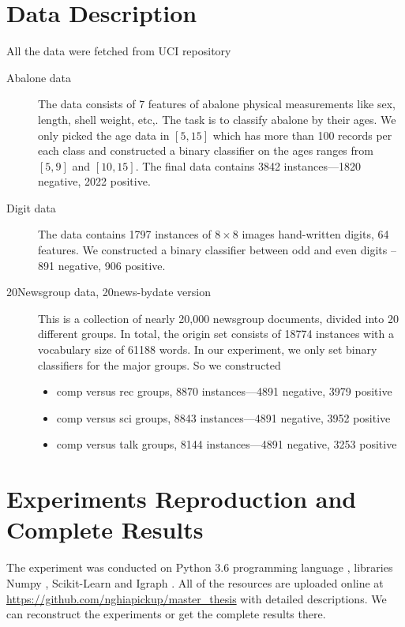 \section*{Data Description}
All the data were fetched from UCI repository \parencite{Dua:2017}
\begin{description}
	\item[Abalone data] The data consists of 7 features of abalone physical measurements like sex, length, shell weight, etc,. The task is to classify abalone by their ages. We only picked the age data in $[5, 15]$ which has more than 100 records per each class and constructed a binary classifier on the ages ranges from $[5,9]$ and $[10, 15]$. The final data contains 3842 instances---1820 negative, 2022 positive.
	
	\item[Digit data] The data contains 1797 instances of $8 \times 8$ images hand-written digits, 64 features. We constructed a binary classifier between odd and even digits -- 891 negative, 906 positive.
		
	\item[20Newsgroup data, 20news-bydate version] This is a collection of nearly 20,000 newsgroup documents, divided into 20 different groups. In total, the origin set consists of 18774 instances with a vocabulary size of 61188 words. In our experiment, we only set binary classifiers for the major groups. So we constructed 
	\begin{itemize}
		\item comp versus rec groups, 8870 instances---4891 negative, 3979 positive
		\item comp versus sci groups, 8843 instances---4891 negative, 3952 positive
		\item comp versus talk groups, 8144 instances---4891 negative, 3253 positive
	\end{itemize}
\end{description}

\section*{Experiments Reproduction and Complete Results}
The experiment was conducted on Python 3.6 programming language \parencite{python3.6}, libraries Numpy \parencite{numpy}, Scikit-Learn \parencite{scikit-learn} and Igraph \parencite{Csardi2006}. All of the resources are uploaded online at \url{https://github.com/nghiapickup/master_thesis} with detailed descriptions. We can reconstruct the experiments or get the complete results there.